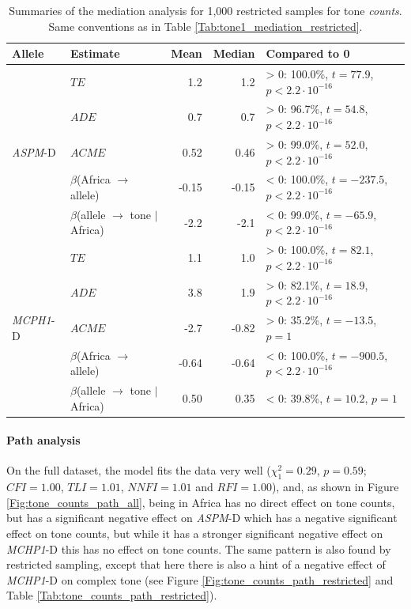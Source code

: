 \documentclass[twoside,onecolumn]{article}
\begin{document}
\begin{table}[h]
  \caption{Summaries of the mediation analysis for 1,000 restricted samples for tone \textit{counts}. Same conventions as in Table \ref{Tab:tone1_mediation_restricted}.}
  \label{Tab:tone_counts_mediation_restricted}
  \centering
  \begin{tabular}{|l|l|r|r|l|}
    \toprule
    \textbf{Allele} & \textbf{Estimate} & \textbf{Mean} & \textbf{Median} & \textbf{Compared to 0} \\
    \midrule
    \multirow{5}{*}{\textit{ASPM}-D} & $TE$ & 1.2 & 1.2 & > 0: 100.0\%, $t = 77.9$, $p < 2.2\cdot10^{-16}$ \\
    & $ADE$ & 0.7 & 0.7 & > 0: 96.7\%, $t = 54.8$, $p < 2.2\cdot10^{-16}$ \\
    & $ACME$ & 0.52 & 0.46 & > 0: 99.0\%, $t = 52.0$, $p < 2.2\cdot10^{-16}$ \\
    & $\beta$(Africa $\rightarrow$ allele) & -0.15 & -0.15 & < 0: 100.0\%, $t = -237.5$, $p < 2.2\cdot10^{-16}$ \\
    & $\beta$(allele $\rightarrow$ tone $\mid$ Africa) & -2.2 & -2.1 & < 0: 99.0\%, $t = -65.9$, $p < 2.2\cdot10^{-16}$ \\
    \midrule
    \multirow{5}{*}{\textit{MCPH1}-D} & $TE$ & 1.1 & 1.0 & > 0: 100.0\%, $t = 82.1$, $p < 2.2\cdot10^{-16}$ \\
    & $ADE$ & 3.8 & 1.9 & > 0: 82.1\%, $t = 18.9$, $p < 2.2\cdot10^{-16}$ \\
    & $ACME$ & -2.7 & -0.82 & > 0: 35.2\%, $t = -13.5$, $p = 1$ \\
    & $\beta$(Africa $\rightarrow$ allele) & -0.64 & -0.64 & < 0: 100.0\%, $t = -900.5$, $p < 2.2\cdot10^{-16}$ \\
    & $\beta$(allele $\rightarrow$ tone $\mid$ Africa) & 0.50 & 0.35 & < 0: 39.8\%, $t = 10.2$, $p = 1$ \\
    \bottomrule
  \end{tabular}
\end{table}


\paragraph{Path analysis}

On the full dataset, the model fits the data very well ($\chi^2_{1} = 0.29$, $p = 0.59$; $CFI=1.00$, $TLI=1.01$, $NNFI=1.01$ and $RFI=1.00$), and, as shown in Figure \ref{Fig:tone_counts_path_all}, being in Africa has no direct effect on tone counts, but has a significant negative effect on \textit{ASPM}-D which has a negative significant effect on tone counts, but while it has a stronger significant negative effect on \textit{MCHP1}-D this has no effect on tone counts.
The same pattern is also found by restricted sampling, except that here there is also a hint of a negative effect of \textit{MCHP1}-D on complex tone (see Figure \ref{Fig:tone_counts_path_restricted} and Table \ref{Tab:tone_counts_path_restricted}).
\end{document}
